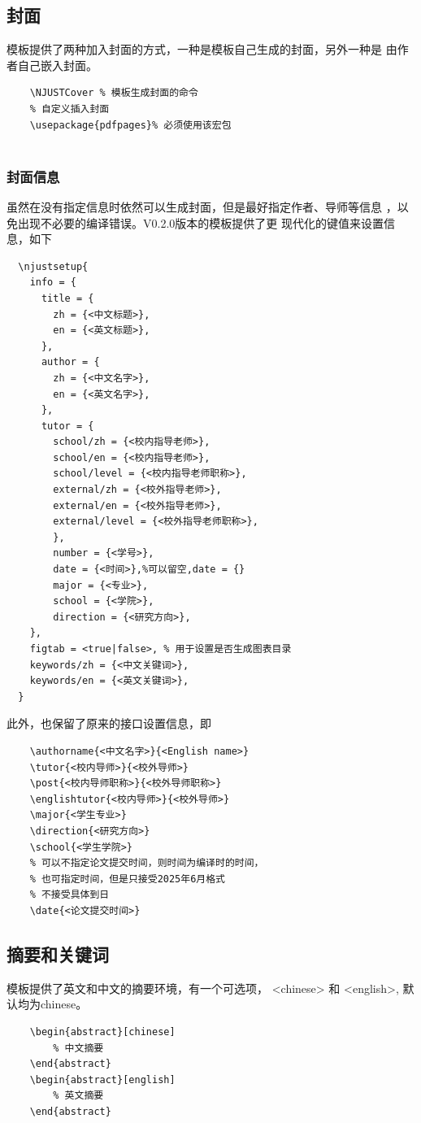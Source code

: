 \subsection{封面}
模板提供了两种加入封面的方式，一种是模板自己生成的封面，另外一种是
由作者自己嵌入封面。
\begin{lstlisting}
    \NJUSTCover % 模板生成封面的命令
    % 自定义插入封面
    \usepackage{pdfpages}% 必须使用该宏包
    
\end{lstlisting}

\subsubsection{封面信息}
虽然在没有指定信息时依然可以生成封面，但是最好指定作者、导师等信息
，以免出现不必要的编译错误。{\ttfamily V0.2.0}版本的模板提供了更
现代化的键值来设置信息，如下
\begin{lstlisting}
  \njustsetup{
    info = {
      title = {
        zh = {<中文标题>},
        en = {<英文标题>},
      },
      author = {
        zh = {<中文名字>},
        en = {<英文名字>},
      },
      tutor = {
        school/zh = {<校内指导老师>},
        school/en = {<校内指导老师>},
        school/level = {<校内指导老师职称>},
        external/zh = {<校外指导老师>},
        external/en = {<校外指导老师>},
        external/level = {<校外指导老师职称>},
        },
        number = {<学号>},
        date = {<时间>},%可以留空,date = {}
        major = {<专业>},
        school = {<学院>},
        direction = {<研究方向>},
    },
    figtab = <true|false>, % 用于设置是否生成图表目录
    keywords/zh = {<中文关键词>},
    keywords/en = {<英文关键词>},
  }
\end{lstlisting}

此外，也保留了原来的接口设置信息，即
\begin{lstlisting}
    \authorname{<中文名字>}{<English name>}
    \tutor{<校内导师>}{<校外导师>}
    \post{<校内导师职称>}{<校外导师职称>}
    \englishtutor{<校内导师>}{<校外导师>}
    \major{<学生专业>}
    \direction{<研究方向>}
    \school{<学生学院>}
    % 可以不指定论文提交时间，则时间为编译时的时间，
    % 也可指定时间，但是只接受2025年6月格式
    % 不接受具体到日
    \date{<论文提交时间>}
\end{lstlisting}

\subsection{摘要和关键词}
模板提供了英文和中文的摘要环境，有一个可选项，
{\ttfamily <chinese>} 和 {\ttfamily <english>},
默认均为{\ttfamily chinese}。
\begin{lstlisting}
    \begin{abstract}[chinese]
        % 中文摘要
    \end{abstract}
    \begin{abstract}[english]
        % 英文摘要
    \end{abstract}
\end{lstlisting}


